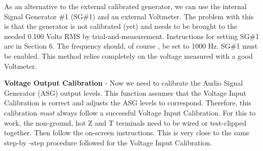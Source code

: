 As an alternative to the external calibrated generator,  we can use the internal Signal Generator \#1 (SG\#1) and an external Voltmeter.  The problem with this is that the generator is not calibrated (yet) and needs to be brought to the needed 0.100 Volts RMS by trial-and-measurement.  Instructions for setting SG\#1 are in Section 6.  The frequency should, of course , be set to 1000 Hz.  SG\#1 must be enabled.   This method relies completely on the voltage measured with a good Voltmeter.

\textbf{Voltage Output Calibration} - Now we need to calibrate the Audio Signal Generator (ASG) output levels.  This function assumes that the Voltage Input Calibration is correct and adjusts the ASG levels to correspond.  Therefore, this calibration \textit{must} always follow a successful Voltage Input Calibration.  For this to work, the non-ground, hot Z and T terminals need to be wired  or test-clipped together.  Then follow the on-screen instructions.  This is very close to the same step-by -step procedure followed for the Voltage Input Calibration. 

